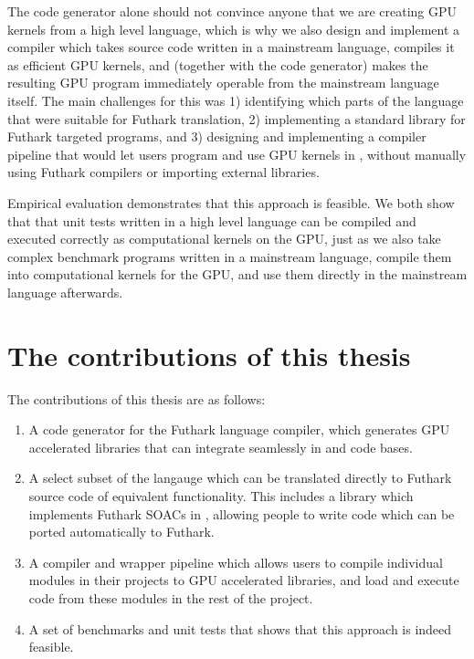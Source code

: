 The code generator alone should not convince anyone that we are creating GPU
kernels from a high level language, which is why we also design and implement a
compiler which takes source code written in a mainstream language, compiles it
as efficient GPU kernels, and (together with the code generator) makes the
resulting GPU program immediately operable from the mainstream language itself.  
The main challenges for this was 1) identifying which parts of the \fsharp{}
language that were suitable for Futhark translation, 2) implementing a standard
library for Futhark targeted \fsharp{} programs, and 3) designing and implementing a compiler
pipeline that would let users program and use GPU kernels in \fsharp{}, without
manually using Futhark compilers or importing external libraries.

Empirical evaluation demonstrates that this approach is feasible.
We both show that that unit tests written in a high level language can be compiled and executed
correctly as computational kernels on the GPU, just as we also take complex
benchmark programs written in a mainstream language, compile them into
computational kernels for the GPU, and use them directly in the mainstream
language afterwards.

\clearpage

\section*{The contributions of this thesis}
The contributions of this thesis are as follows:
\begin{enumerate}
\item A \csharp{} code generator for the Futhark language compiler, which
  generates GPU accelerated libraries that can integrate seamlessly in 
  \csharp{} and \fsharp{} code bases.

\item A select subset of the \fsharp{} langauge which can be translated directly to
  Futhark source code of equivalent functionality. This includes a
  library which implements Futhark SOACs\cite{soacs} in \fsharp{}, allowing
  people to write \fsharp{} code which can be ported automatically to Futhark.

\item A compiler and wrapper pipeline which allows users to compile individual
  \fsharp{} modules in their projects to GPU accelerated libraries, and load and
  execute code from these modules in the rest of the \fsharp{} project.

\item A set of benchmarks and unit tests that shows that this approach is indeed feasible.
\end{enumerate}

